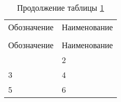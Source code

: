 \begin{longtable}{|p{60mm}|p{100mm}|}
  \caption{Простая} \label{appendix_signature:t:1} \\
  \hline
  \multicolumn{1}{|p{60mm}|}{\centering Обозначение} &
  \multicolumn{1}{p{100mm}|}{\centering Наименование} \\\hhline{|==|}
  \endfirsthead
  \caption*{Продолжение таблицы \ref{appendix_signature:t:1}} \\
 \hline
  \multicolumn{1}{|p{60mm}|}{\centering Обозначение} &
  \multicolumn{1}{p{100mm}|}{\centering Наименование} \\\hhline{|==|}
  \endhead
   1    &   2   \\ \hline
   3    &   4   \\ \hline
   5    &   6   \\ \hline
\end{longtable}

